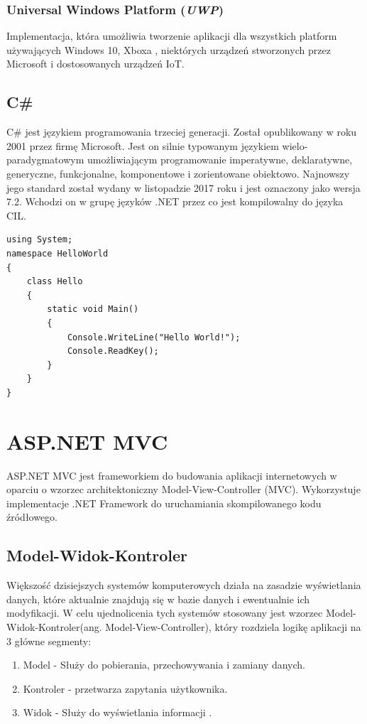 \subsection{Universal Windows Platform (\textit{UWP})}
Implementacja, która umożliwia tworzenie aplikacji dla wszystkich platform używających Windows 10, Xboxa , niektórych urządzeń stworzonych przez Microsoft i dostosowanych urządzeń IoT.


\section{C\#}

C\# jest językiem programowania trzeciej generacji. Został opublikowany w roku 2001 przez firmę Microsoft. Jest on silnie typowanym językiem wielo-paradygmatowym umożliwiającym programowanie imperatywne, deklaratywne, generyczne, funkcjonalne, komponentowe i zorientowane obiektowo. Najnowszy jego standard został wydany w listopadzie 2017 roku i jest oznaczony jako wersja 7.2. Wchodzi on w grupę języków .NET przez co jest kompilowalny do języka CIL. \cite{CPlotekInfo}
\begin{minipage}{\linewidth}
\begin{lstlisting}[frame=single, numbers=none,captionpos=b, 
caption={Przykładowy kod aplikacji "Hello World" w języku C\#}]
using System;
namespace HelloWorld
{
    class Hello 
    {
        static void Main() 
        {
            Console.WriteLine("Hello World!");
            Console.ReadKey();
        }
    }
}
\end{lstlisting}
\end{minipage}
\newpage
{\let\cleardoublepage\relax \chapter{ASP.NET MVC}}


ASP.NET MVC jest frameworkiem do budowania aplikacji internetowych w oparciu o wzorzec architektoniczny Model-View-Controller (MVC). Wykorzystuje implementacje .NET Framework do uruchamiania skompilowanego kodu źródłowego.


\section{Model-Widok-Kontroler}
\label{section_Kontro}
Większość dzisiejszych systemów komputerowych działa na zasadzie wyświetlania danych, które aktualnie znajdują się w bazie danych i ewentualnie ich modyfikacji. W celu ujednolicenia tych systemów stosowany jest wzorzec Model-Widok-Kontroler(ang. Model-View-Controller), który rozdziela logikę aplikacji na 3 główne segmenty:
\begin{enumerate}
	\item Model - Służy do pobierania, przechowywania i zamiany danych.
	\item Kontroler - przetwarza zapytania użytkownika.
	\item Widok - Służy do wyświetlania informacji .
\end{enumerate}

